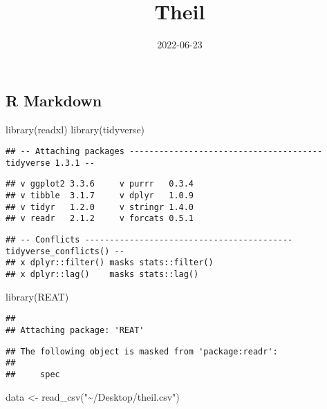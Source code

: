 \documentclass[
]{article}
\title{Theil}
\author{}
\date{\vspace{-2.5em}2022-06-23}
\newenvironment{Shaded}{\begin{snugshade}}{\end{snugshade}}
\newcommand{\FunctionTok}[1]{\textcolor[rgb]{0.00,0.00,0.00}{#1}}
\newcommand{\NormalTok}[1]{#1}
\newcommand{\OtherTok}[1]{\textcolor[rgb]{0.56,0.35,0.01}{#1}}
\newcommand{\StringTok}[1]{\textcolor[rgb]{0.31,0.60,0.02}{#1}}
\begin{document}
\maketitle

\hypertarget{r-markdown}{%
\subsection{R Markdown}\label{r-markdown}}

\begin{Shaded}
\begin{Highlighting}[]
\FunctionTok{library}\NormalTok{(readxl)}
\FunctionTok{library}\NormalTok{(tidyverse)}
\end{Highlighting}
\end{Shaded}

\begin{verbatim}
## -- Attaching packages --------------------------------------- tidyverse 1.3.1 --
\end{verbatim}

\begin{verbatim}
## v ggplot2 3.3.6     v purrr   0.3.4
## v tibble  3.1.7     v dplyr   1.0.9
## v tidyr   1.2.0     v stringr 1.4.0
## v readr   2.1.2     v forcats 0.5.1
\end{verbatim}

\begin{verbatim}
## -- Conflicts ------------------------------------------ tidyverse_conflicts() --
## x dplyr::filter() masks stats::filter()
## x dplyr::lag()    masks stats::lag()
\end{verbatim}

\begin{Shaded}
\begin{Highlighting}[]
\FunctionTok{library}\NormalTok{(REAT)}
\end{Highlighting}
\end{Shaded}

\begin{verbatim}
## 
## Attaching package: 'REAT'
\end{verbatim}

\begin{verbatim}
## The following object is masked from 'package:readr':
## 
##     spec
\end{verbatim}

\begin{Shaded}
\begin{Highlighting}[]
\NormalTok{data }\OtherTok{\textless{}{-}} \FunctionTok{read\_csv}\NormalTok{(}\StringTok{"\textasciitilde{}/Desktop/theil.csv"}\NormalTok{)}
\end{Highlighting}
\end{Shaded}
\end{document}
